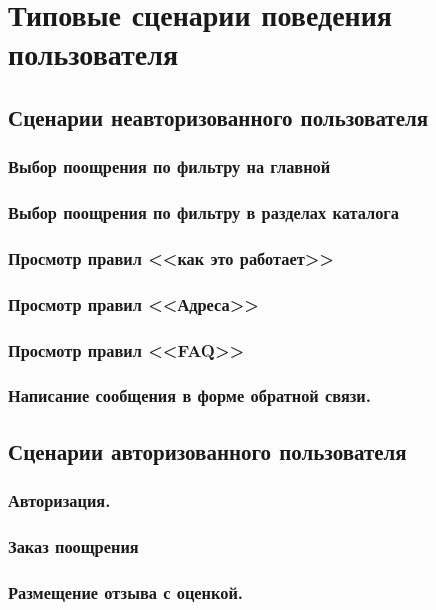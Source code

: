 \chapter{Типовые сценарии поведения пользователя}

    \section{Сценарии неавторизованного пользователя}

        \subsection{Выбор поощрения по фильтру на главной}
        \subsection{Выбор поощрения по фильтру в разделах каталога}
        \subsection{Просмотр правил <<как это работает>>}
        \subsection{Просмотр правил <<Адреса>>}
        \subsection{Просмотр правил <<FAQ>>}
        \subsection{Написание сообщения в форме обратной связи.}

     \section{Сценарии авторизованного пользователя}

        \subsection{Авторизация.}
        \subsection{Заказ поощрения}
        \subsection{Размещение отзыва с оценкой.}
